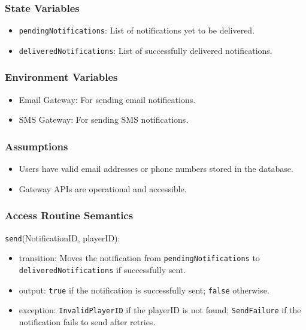 \documentclass[12pt, titlepage]{article}
\begin{document}
\subsubsection{State Variables}

\begin{itemize}
    \item \texttt{pendingNotifications}: List of notifications yet to be delivered.
    \item \texttt{deliveredNotifications}: List of successfully delivered notifications.
\end{itemize}

\subsubsection{Environment Variables}

\begin{itemize}
    \item Email Gateway: For sending email notifications.
    \item SMS Gateway: For sending SMS notifications.
\end{itemize}

\subsubsection{Assumptions}

\begin{itemize}
    \item Users have valid email addresses or phone numbers stored in the database.
    \item Gateway APIs are operational and accessible.
\end{itemize}

\subsubsection{Access Routine Semantics}

\noindent \texttt{send}(NotificationID, playerID):
\begin{itemize}
    \item transition: Moves the notification from \texttt{pendingNotifications} to \texttt{deliveredNotifications} if successfully sent.
    \item output: \texttt{true} if the notification is successfully sent; \texttt{false} otherwise.
    \item exception: \texttt{InvalidPlayerID} if the playerID is not found; \texttt{SendFailure} if the notification fails to send after retries.
\end{itemize}
\end{document}
